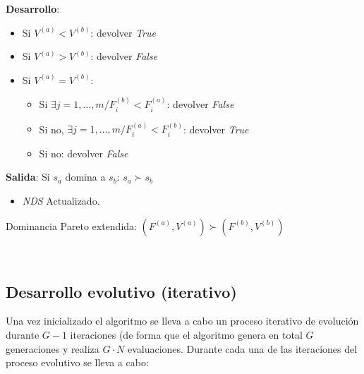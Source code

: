 \begin{itemize}
\begin{center}
\begin{minipage}[H]{0.8\linewidth}
\begin{algorithm}[H]
 \vspace{0.3cm}
  
 \textbf{Desarrollo}:\\
        \begin{itemize}
        	\vspace{0.15cm}\item Si $V^{(a)} < V^{(b)}$: devolver \textit{True}
        	\vspace{0.15cm}\item Si $V^{(a)} > V^{(b)}$: devolver \textit{False}
        	\vspace{0.15cm}\item Si $V^{(a)} = V^{(b)}$: 
        	\begin{itemize}
        		\vspace{0.15cm}\item Si $\exists j=1, \dots, m / F_i^{(b)} < F_i^{(a)}$: devolver \textit{False} 
            	\vspace{0.15cm}\item Si no, $\exists j=1, \dots, m / F_i^{(a)} < F_i^{(b)}$: devolver \textit{True} 
            	\vspace{0.15cm}\item Si no: devolver \textit{False}
        	\end{itemize}
        \end{itemize}
    \vspace{0.3cm} 
    
    \textbf{Salida}: Si $s_a$ domina a $s_b$: $s_a \succ s_b$
    \begin{itemize}
        \item \textit{NDS} Actualizado.
    \end{itemize}
 \caption{Dominancia Pareto extendida: $(F^{(a)}, V^{(a)}) \succ (F^{(b)}, V^{(b)})$}
 \label{alg:3}
\end{algorithm}
\end{minipage}\\
\end{center}

\end{itemize}

\subsection{Desarrollo evolutivo (iterativo)}

Una vez inicializado el algoritmo se lleva a cabo un proceso iterativo de evolución durante $G-1$ iteraciones (de forma que el algoritmo genera en total $G$ generaciones y realiza $G \cdot N$ evaluaciones. Durante cada una de las iteraciones del proceso evolutivo se lleva a cabo:

